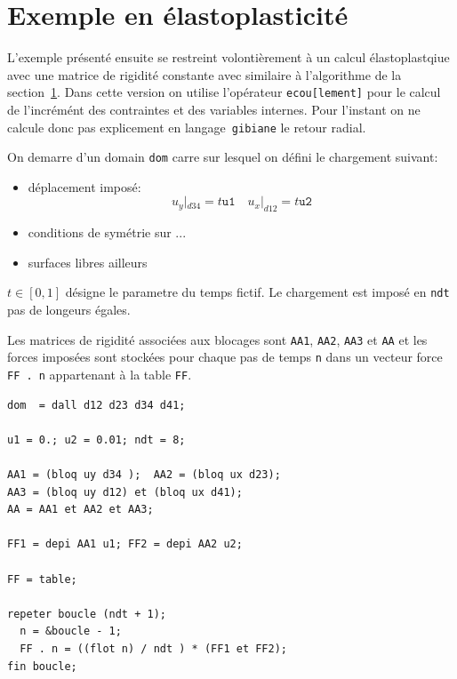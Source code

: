 \section{Exemple en élastoplasticité}

L'exemple présenté ensuite se restreint volontièrement 
à un calcul élastoplastqiue avec une matrice de rigidité 
constante avec similaire à l'algorithme de 
la section~\ref{}. Dans cette version on utilise l'opérateur 
\texttt{ecou[lement]} pour le calcul de l'incrémént 
des contraintes et des variables internes. Pour 
l'instant on ne calcule donc 
pas  explicement en langage~\texttt{gibiane} le retour radial.

\begin{castemcom}
On demarre d'un domain \texttt{dom} carre 
sur lesquel on défini le chargement suivant:
\begin{itemize}
 
 \item déplacement imposé:
  $$
    u_y |_{d34} = t \texttt{u1} 
    \quad 
    u_x |_{d12} = t \texttt{u2}  
  $$
 
 \item conditions de symétrie sur ...   
  
 \item surfaces libres ailleurs  

\end{itemize}
$t \in [0, 1]$ désigne le parametre du temps fictif. Le chargement 
est imposé en \texttt{ndt} pas de longeurs égales. 

Les matrices de rigidité associées aux blocages sont \texttt{AA1}, \texttt{AA2}, \texttt{AA3} et 
\texttt{AA} et les forces imposées sont stockées pour chaque pas de temps \texttt{n} 
dans un vecteur force \texttt{FF . n} appartenant à la table \texttt{FF}.
\end{castemcom}
\begin{castemlines}
\begin{verbatim}
dom  = dall d12 d23 d34 d41;

u1 = 0.; u2 = 0.01; ndt = 8;

AA1 = (bloq uy d34 );  AA2 = (bloq ux d23);
AA3 = (bloq uy d12) et (bloq ux d41);
AA = AA1 et AA2 et AA3;

FF1 = depi AA1 u1; FF2 = depi AA2 u2;

FF = table;
  
repeter boucle (ndt + 1);
  n = &boucle - 1;  
  FF . n = ((flot n) / ndt ) * (FF1 et FF2);
fin boucle;

\end{verbatim}
\end{castemlines}
 

